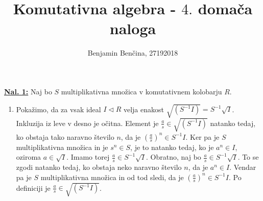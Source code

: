 \documentclass[a4paper, 12pt]{article}
\title{Komutativna algebra - $4.$ domača naloga}
\author{Benjamin Benčina, 27192018}
\newcommand{\subideal}{\vartriangleleft}
\begin{document}
\maketitle

\underline{\textbf{Nal. 1:}}
Naj bo $S$ multiplikativna množica v komutativnem kolobarju $R$.
\begin{enumerate}[label=(\alph*)]
	\item Pokažimo, da za vsak ideal $I \subideal R$ velja enakost $\sqrt{(S^{-1}I)} = S^{-1}\sqrt{I}$.
	Inkluzija iz leve v desno je očitna. Element je $\frac{a}{s} \in \sqrt{(S^{-1}I)}$ natanko tedaj, ko  obstaja tako naravno število $n$, da je $\left( \frac{a}{s} \right)^n \in S^{-1}I$. Ker pa je $S$ multiplikativna množica in je $s^n \in S$, je to natanko tedaj, ko je $a^n \in I$, oziroma $a \in \sqrt{I}$. Imamo torej $\frac{a}{s} \in S^{-1}\sqrt{I}$.
	Obratno, naj bo $\frac{a}{s} \in S^{-1}\sqrt{I}$. To se zgodi natanko tedaj, ko obstaja neko naravno število $n$, da je $a^n \in I$. Vendar pa je $S$ multiplikativna množica in od tod sledi, da je $\left( \frac{a}{s} \right)^n \in S^{-1}I$. Po definiciji je $\frac{a}{s} \in \sqrt{(S^{-1}I)}$.
	

\end{enumerate}
\end{document}
